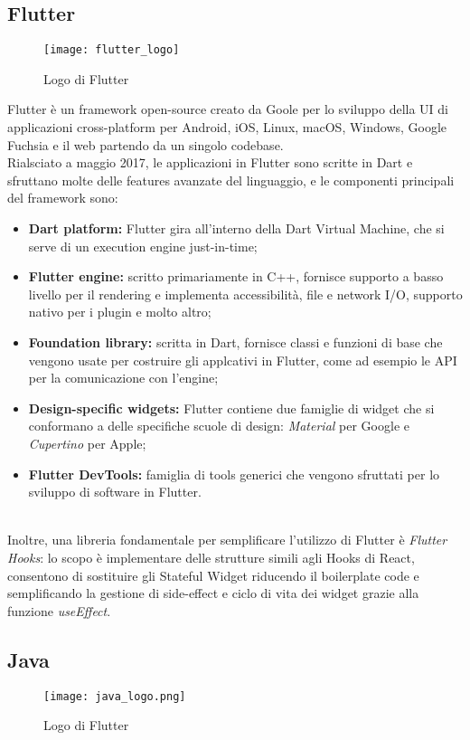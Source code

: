 \subsection{Flutter}
\begin{figure}[ht]
    \centering
    \texttt{[image: flutter\_logo]}
    \caption{Logo di Flutter}
\end{figure} \aCapo{}
Flutter è un framework open-source creato da Goole per lo sviluppo della UI di applicazioni cross-platform per Android, iOS, Linux, macOS, Windows, Google Fuchsia e il web partendo da un singolo codebase.\\
Rialsciato a maggio 2017, le applicazioni in Flutter sono scritte in Dart e sfruttano molte delle features avanzate del linguaggio, e le componenti principali del framework sono:
\begin{itemize}
    \item \textbf{Dart platform:} Flutter gira all'interno della Dart Virtual Machine, che si serve di un execution engine just-in-time;
    \item \textbf{Flutter engine:} scritto primariamente in C++, fornisce supporto a basso livello per il rendering e implementa accessibilità, file e network I/O, supporto nativo per i plugin e molto altro;
    \item \textbf{Foundation library:} scritta in Dart, fornisce classi e funzioni di base che vengono usate per costruire gli applcativi in Flutter, come ad esempio le API per la comunicazione con l'engine;
    \item \textbf{Design-specific widgets:} Flutter contiene due famiglie di widget che si conformano a delle specifiche scuole di design: \textit{Material} per Google e \textit{Cupertino} per Apple;
    \item \textbf{Flutter DevTools:} famiglia di tools generici che vengono sfruttati per lo sviluppo di software in Flutter.
\end{itemize}
~\\
Inoltre, una libreria fondamentale per semplificare l'utilizzo di Flutter è \textit{Flutter Hooks}: lo scopo è implementare delle strutture simili agli Hooks di React, consentono di sostituire gli Stateful Widget riducendo il boilerplate code e semplificando la gestione di side-effect e ciclo di vita dei widget grazie alla funzione \textit{useEffect}.

\subsection{Java}
\begin{figure}[ht]
    \centering
    \texttt{[image: java\_logo.png]}
    \caption{Logo di Flutter}
\end{figure} \aCapo{}

